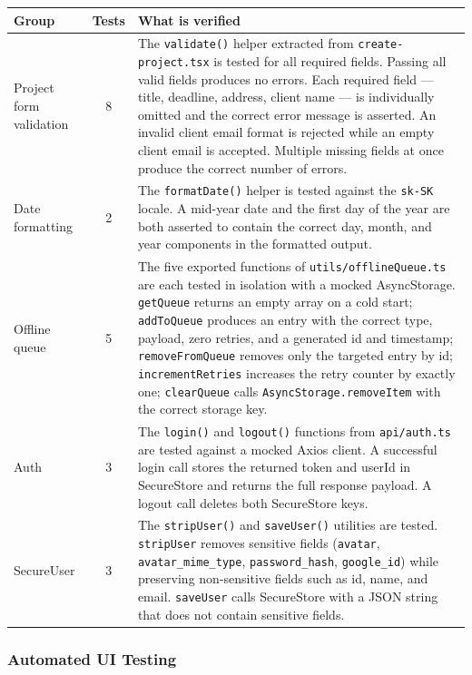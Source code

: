\documentclass[12pt,a4paper]{article}
\begin{document}
\begin{tabularx}{\textwidth}{|l|c|X|}
\hline
\textbf{Group} & \textbf{Tests} & \textbf{What is verified} \\
\hline
Project form validation & 8 &
  The \texttt{validate()} helper extracted from \texttt{create-project.tsx} is tested for all required fields. Passing all valid fields produces no errors. Each required field --- title, deadline, address, client name --- is individually omitted and the correct error message is asserted. An invalid client email format is rejected while an empty client email is accepted. Multiple missing fields at once produce the correct number of errors. \\
\hline
Date formatting & 2 &
  The \texttt{formatDate()} helper is tested against the \texttt{sk-SK} locale. A mid-year date and the first day of the year are both asserted to contain the correct day, month, and year components in the formatted output. \\
\hline
Offline queue & 5 &
  The five exported functions of \texttt{utils/offlineQueue.ts} are each tested in isolation with a mocked AsyncStorage. \texttt{getQueue} returns an empty array on a cold start; \texttt{addToQueue} produces an entry with the correct type, payload, zero retries, and a generated id and timestamp; \texttt{removeFromQueue} removes only the targeted entry by id; \texttt{incrementRetries} increases the retry counter by exactly one; \texttt{clearQueue} calls \texttt{AsyncStorage.removeItem} with the correct storage key. \\
\hline
Auth & 3 &
  The \texttt{login()} and \texttt{logout()} functions from \texttt{api/auth.ts} are tested against a mocked Axios client. A successful login call stores the returned token and userId in SecureStore and returns the full response payload. A logout call deletes both SecureStore keys. \\
\hline
SecureUser & 3 &
  The \texttt{stripUser()} and \texttt{saveUser()} utilities are tested. \texttt{stripUser} removes sensitive fields (\texttt{avatar}, \texttt{avatar\_mime\_type}, \texttt{password\_hash}, \texttt{google\_id}) while preserving non-sensitive fields such as id, name, and email. \texttt{saveUser} calls SecureStore with a JSON string that does not contain sensitive fields. \\
\hline
\end{tabularx}

\subsubsection{Automated UI Testing}
\end{document}
